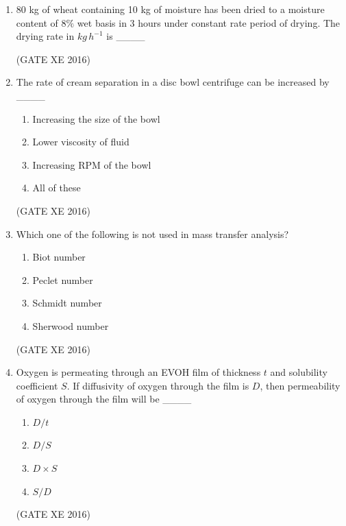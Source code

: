 \documentclass[12pt]{article}
\begin{document}
\begin{enumerate}
\item 80 kg of wheat containing 10 kg of moisture has been dried to a moisture content of $8\%$ wet basis in 3 hours under constant rate period of drying. The drying rate in $kg \, h^{-1}$ is \_\_\_\_

(GATE XE 2016)

\item The rate of cream separation in a disc bowl centrifuge can be increased by \_\_\_\_
\begin{multicols}{2}
\begin{enumerate}
\item Increasing the size of the bowl
\item Lower viscosity of fluid
\item Increasing RPM of the bowl
\item All of these
\end{enumerate}
\end{multicols}
(GATE XE 2016)

\item Which one of the following is not used in mass transfer analysis?
\begin{multicols}{2}
\begin{enumerate}
\item Biot number
\item Peclet number
\item Schmidt number
\item Sherwood number
\end{enumerate}
\end{multicols}
(GATE XE 2016)

\item Oxygen is permeating through an EVOH film of thickness $t$ and solubility coefficient $S$. If diffusivity of oxygen through the film is $D$, then permeability of oxygen through the film will be \_\_\_\_
\begin{multicols}{4}
\begin{enumerate}
\item $D/t$
\item $D/S$
\item $D \times S$
\item $S/D$
\end{enumerate}
\end{multicols}
(GATE XE 2016)


\end{enumerate}
\end{document}
